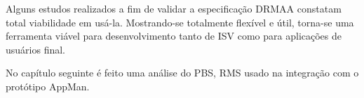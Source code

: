 Alguns estudos realizados \cite{Herrera2007, Templeton2006} a fim de validar a especificação DRMAA constatam total viabilidade em usá-la. Mostrando-se totalmente flexível e útil, torna-se uma ferramenta viável para desenvolvimento tanto de ISV como para aplicações de usuários final.

No capítulo seguinte é feito uma análise do PBS, RMS usado na integração com o protótipo AppMan.